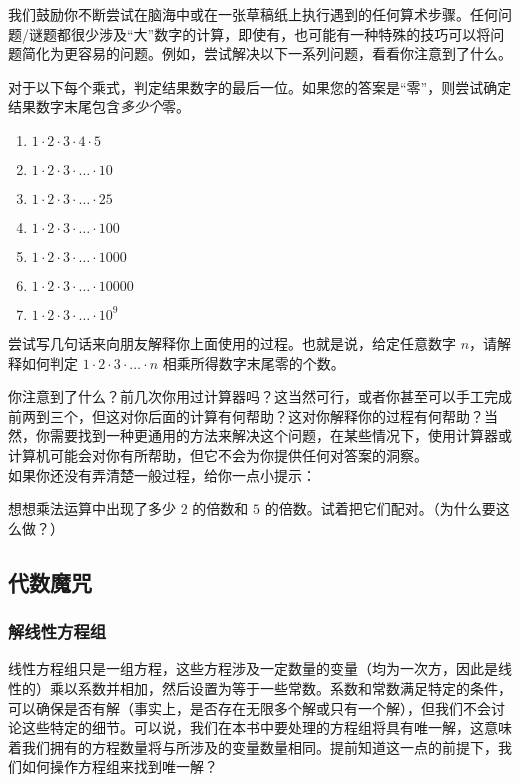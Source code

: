 我们鼓励你不断尝试在脑海中或在一张草稿纸上执行遇到的任何算术步骤。任何问题/谜题都很少涉及``大''数字的计算，即使有，也可能有一种特殊的技巧可以将问题简化为更容易的问题。例如，尝试解决以下一系列问题，看看你注意到了什么。

\begin{problem}
    对于以下每个乘式，判定结果数字的最后一位。如果您的答案是``零''，则尝试确定结果数字末尾包含\emph{多少个}零。
    \begin{enumerate}
        \item $1 \cdot 2 \cdot 3 \cdot 4 \cdot 5$
        \item $1 \cdot 2 \cdot 3 \cdot \dots \cdot 10$
        \item $1 \cdot 2 \cdot 3 \cdot \dots \cdot 25$
        \item $1 \cdot 2 \cdot 3 \cdot \dots \cdot 100$
        \item $1 \cdot 2 \cdot 3 \cdot \dots \cdot 1000$
        \item $1 \cdot 2 \cdot 3 \cdot \dots \cdot 10000$
        \item $1 \cdot 2 \cdot 3 \cdot \dots \cdot 10^9$
    \end{enumerate}
    尝试写几句话来向朋友解释你上面使用的过程。也就是说，给定任意数字 $n$，请解释如何判定 $1\cdot2\cdot3\cdot \dots \cdot n$ 相乘所得数字末尾零的个数。
\end{problem}

你注意到了什么？前几次你用过计算器吗？这当然可行，或者你甚至可以手工完成前两到三个，但这对你后面的计算有何帮助？这对你解释你的过程有何帮助？当然，你需要找到一种更通用的方法来解决这个问题，在某些情况下，使用计算器或计算机可能会对你有所帮助，但它不会为你提供任何对答案的洞察。\\
如果你还没有弄清楚一般过程，给你一点小提示：
\begin{hint}
    想想乘法运算中出现了多少 $2$ 的倍数和 $5$ 的倍数。试着把它们配对。（为什么要这么做？）
\end{hint}

\subsection{代数魔咒}

\subsubsection*{解线性方程组}

线性方程组只是一组方程，这些方程涉及一定数量的变量（均为一次方，因此是线性的）乘以系数并相加，然后设置为等于一些常数。系数和常数满足特定的条件，可以确保是否有解（事实上，是否存在无限多个解或只有一个解），但我们不会讨论这些特定的细节。可以说，我们在本书中要处理的方程组将具有唯一解，这意味着我们拥有的方程数量将与所涉及的变量数量相同。提前知道这一点的前提下，我们如何操作方程组来找到唯一解？

